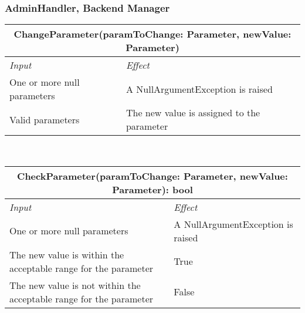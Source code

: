 		\subsubsection*{AdminHandler, Backend Manager}
			\begin{tabular}{ |l|l| }
				\hline
				\multicolumn{2}{|c|}{ChangeParameter(paramToChange: Parameter, newValue: Parameter)}\\
				\hline
				\textit{Input} & \textit{Effect}\\ \hline
				One or more null parameters & A NullArgumentException is raised\\ \hline
				Valid parameters & The new value is assigned to the parameter\\ \hline
			\end{tabular}
			\\
			\begin{tabular}{ |l|l| }
				\hline
				\multicolumn{2}{|c|}{CheckParameter(paramToChange: Parameter, newValue: Parameter): bool}\\
				\hline
				\textit{Input} & \textit{Effect}\\ \hline
				One or more null parameters & A NullArgumentException is raised\\ \hline
				The new value is within the acceptable range for the parameter & True\\ \hline
				The new value is not within the acceptable range for the parameter & False\\ \hline
			\end{tabular}
			\\
		
		
		
		
		